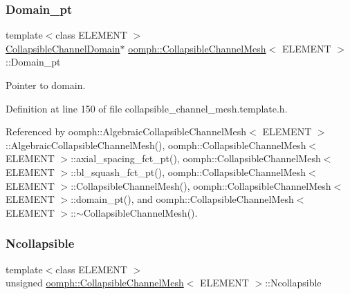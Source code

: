 \subsubsection{\texorpdfstring{Domain\+\_\+pt}{Domain\_pt}}
{\footnotesize\ttfamily template$<$class E\+L\+E\+M\+E\+NT $>$ \\
\hyperlink{classoomph_1_1CollapsibleChannelDomain}{Collapsible\+Channel\+Domain}$\ast$ \hyperlink{classoomph_1_1CollapsibleChannelMesh}{oomph\+::\+Collapsible\+Channel\+Mesh}$<$ E\+L\+E\+M\+E\+NT $>$\+::Domain\+\_\+pt\hspace{0.3cm}{\ttfamily [protected]}}



Pointer to domain. 



Definition at line 150 of file collapsible\+\_\+channel\+\_\+mesh.\+template.\+h.



Referenced by oomph\+::\+Algebraic\+Collapsible\+Channel\+Mesh$<$ E\+L\+E\+M\+E\+N\+T $>$\+::\+Algebraic\+Collapsible\+Channel\+Mesh(), oomph\+::\+Collapsible\+Channel\+Mesh$<$ E\+L\+E\+M\+E\+N\+T $>$\+::axial\+\_\+spacing\+\_\+fct\+\_\+pt(), oomph\+::\+Collapsible\+Channel\+Mesh$<$ E\+L\+E\+M\+E\+N\+T $>$\+::bl\+\_\+squash\+\_\+fct\+\_\+pt(), oomph\+::\+Collapsible\+Channel\+Mesh$<$ E\+L\+E\+M\+E\+N\+T $>$\+::\+Collapsible\+Channel\+Mesh(), oomph\+::\+Collapsible\+Channel\+Mesh$<$ E\+L\+E\+M\+E\+N\+T $>$\+::domain\+\_\+pt(), and oomph\+::\+Collapsible\+Channel\+Mesh$<$ E\+L\+E\+M\+E\+N\+T $>$\+::$\sim$\+Collapsible\+Channel\+Mesh().

\mbox{\label{classoomph_1_1CollapsibleChannelMesh_aa59ff7af47247b2e17b13c45f83fcf86}} 
\subsubsection{\texorpdfstring{Ncollapsible}{Ncollapsible}}
{\footnotesize\ttfamily template$<$class E\+L\+E\+M\+E\+NT $>$ \\
unsigned \hyperlink{classoomph_1_1CollapsibleChannelMesh}{oomph\+::\+Collapsible\+Channel\+Mesh}$<$ E\+L\+E\+M\+E\+NT $>$\+::Ncollapsible\hspace{0.3cm}{\ttfamily [protected]}}



